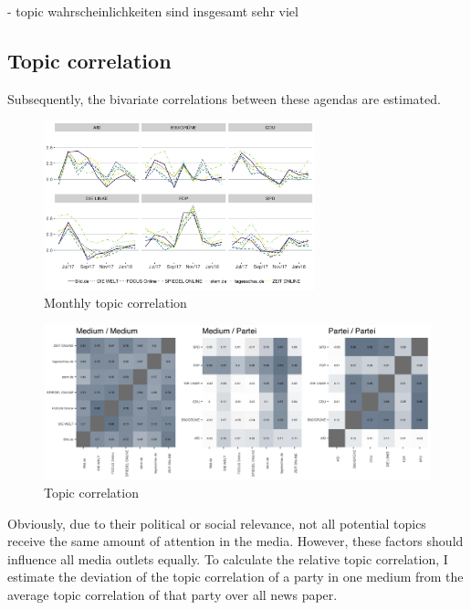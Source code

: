 \documentclass[12pt,a4paper,notitlepage]{article}
\begin{document}
\begin{figure}[H]
\begin{center}
\begin{subfigure}[normla]{0.49\textwidth}
			\label{fig_tf_news}
		\end{subfigure}
	\end{center}
\end{figure}


- topic wahrscheinlichkeiten sind insgesamt sehr viel 


\subsection{Topic correlation}

Subsequently, the bivariate correlations between these agendas are estimated. 

\begin{figure}[H]
	\caption{Monthly topic correlation}
	\begin{center}
		\includegraphics[width=0.7\textwidth]{../figs/corr_timeline}
	\end{center}
\end{figure}

\begin{figure}[H]
	\caption{Topic correlation}
	\begin{center}
		\includegraphics[width=\textwidth]{../figs/corrplot}
	\end{center}
\end{figure}


Obviously, due to their political or social relevance, not all potential topics receive the same amount of attention in the media. However, these factors should influence all media outlets equally. To calculate the relative topic correlation, I estimate the deviation of the topic correlation of a party in one medium from the average topic correlation of that party over all news paper.
\end{document}

